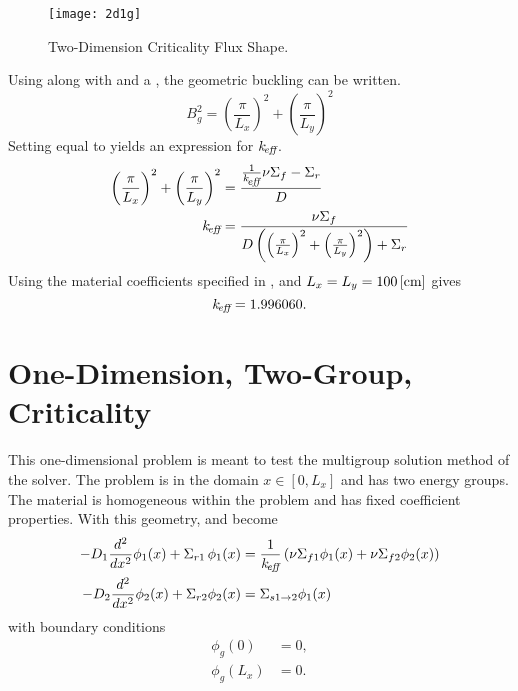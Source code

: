   \begin{figure}
    \centering
    \texttt{[image: 2d1g]}
    \caption{Two-Dimension Criticality Flux Shape.}
    \label{fig:2d1g}
  \end{figure}

  Using  along with  and a
  , the geometric buckling can be written.
  \begin{equation}
    \label{eq:2d1g_buckle_geom}
    B_g^2 = \left(\frac{\pi}{L_x}\right)^2 + \left(\frac{\pi}{L_y}\right)^2
  \end{equation}
  Setting  equal to  yields an
  expression for $k_{\!\mbox{\scriptsize \em eff}}$.
  \begin{align}
    \left(\frac{\pi}{L_x}\right)^2 + \left(\frac{\pi}{L_y}\right)^2 &=
      \frac{\frac{1}{k_{\!\mbox{\scriptsize \em eff}}} \nu \Sigma_f - \Sigma_r}{D} \\
    k_{\!\mbox{\scriptsize \em eff}} &= \frac{\nu \Sigma_f}{D \left( \left(\frac{\pi}{L_x}\right)^2 + 
      \left( \frac{\pi}{L_y}\right)^2 \right) + \Sigma_r}
  \end{align}
  Using the material coefficients specified in , and
  $L_x=L_y=100 \left[\text{{cm}}\right]$ gives 
  \begin{equation}
    \label{eq:keff2d}
    k_{\!\mbox{\scriptsize \em eff}} = 1.996060.
  \end{equation}
  
\section{One-Dimension, Two-Group, Criticality}
  \label{sec:deriv_1d2g}
  This one-dimensional problem is meant to test the multigroup solution method of
  the solver. The problem is in the domain $x \in [0,L_x]$ and has two energy
  groups. The material is homogeneous within the problem and has fixed
  coefficient properties. With this geometry,  and
   become
  \begin{align}
    \label{eq:1d2g_1}
    - D_1 \frac{d^2}{dx^2} \phi_1(x) + \Sigma_{r1} \, \phi_1(x) &= 
      \frac{1}{k_{\!\mbox{\scriptsize \em eff}}} \left( \nu \Sigma_{f1} \phi_1(x) + \nu \Sigma_{f2}
      \phi_2(x) \right) \\
    \label{eq:1d2g_2}
    -D_2 \frac{d^2}{dx^2} \phi_2(x) + \Sigma_{r2} \phi_2(x) &= 
      \Sigma_{s 1 \rightarrow 2} \phi_1(x)
  \end{align}
  with boundary conditions
  \begin{align}
    \label{eq:1d2g_bc0}
    \phi_g(0) &= 0 ,\\
    \label{eq:1d2g_bcLx}
    \phi_g(L_x) &= 0.
  \end{align}
  
